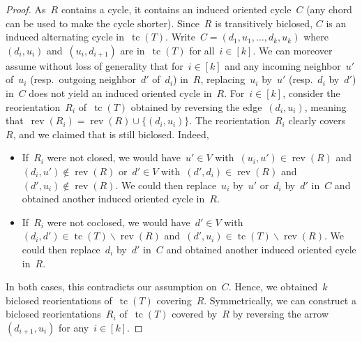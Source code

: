 \documentclass{amsart}
\theoremstyle{definition}
\newcommand{\ssm}{\smallsetminus} %
\DeclareMathOperator{\tc}{tc} %
\DeclareMathOperator{\rev}{rev} %
\begin{document}
\begin{proof}
As~$R$ contains a cycle, it contains an induced oriented cycle~$C$ (any chord can be used to make the cycle shorter).
Since~$R$ is transitively biclosed, $C$ is an induced alternating cycle in~$\tc(T)$.
Write~$C = (d_1, u_1, \dots, d_k, u_k)$ where~$(d_i, u_i)$ and~$(u_i, d_{i+1})$ are in~$\tc(T)$ for all~$i \in [k]$.
We can moreover assume without loss of generality that for~$i \in [k]$ and any incoming neighbor~$u'$ of~$u_i$  (resp.~outgoing neighbor~$d'$ of~$d_i$) in~$R$, replacing~$u_i$ by~$u'$ (resp.~$d_i$ by~$d'$) in~$C$ does not yield an induced oriented cycle in~$R$.
For~$i \in [k]$, consider the reorientation~$R_i$ of~$\tc(T)$ obtained by reversing the edge~$(d_i,u_i)$, meaning that~$\rev(R_i) = \rev(R) \cup \{(d_i,u_i)\}$.
The reorientation~$R_i$ clearly covers~$R$, and we claimed that is still biclosed.
Indeed,
\begin{itemize}
\item If~$R_i$ were not closed, we would have~$u' \in V$ with~$(u_i, u') \in \rev(R)$ and~$(d_i,u') \notin \rev(R)$ or~$d' \in V$ with~$(d',d_i) \in \rev(R)$ and~$(d',u_i) \notin \rev(R)$. We could then replace~$u_i$ by~$u'$ or~$d_i$ by~$d'$ in~$C$ and obtained another induced oriented cycle in~$R$.
\item If~$R_i$ were not coclosed, we would have~$d' \in V$ with~$(d_i,d') \in \tc(T) \ssm \rev(R)$ and~$(d',u_i) \in \tc(T) \ssm \rev(R)$. We could then replace~$d_i$ by~$d'$ in~$C$ and obtained another induced oriented cycle in~$R$.
\end{itemize}
In both cases, this contradicts our assumption on~$C$.
Hence, we obtained~$k$ biclosed reorientations of~$\tc(T)$ covering~$R$.
Symmetrically, we can construct a biclosed reorientations~$R_i$ of~$\tc(T)$ covered by~$R$ by reversing the arrow~$(d_{i+1}, u_i)$ for any~$i \in [k]$.
\end{proof}
\end{document}
